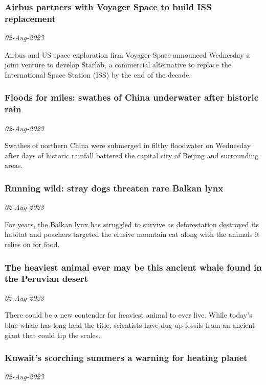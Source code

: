 \subsubsection{Airbus partners with Voyager Space to build ISS replacement \href{https://phys.org/news/2023-08-airbus-partners-voyager-space-iss.html}{}}
\textit{02-Aug-2023}

Airbus and US space exploration firm Voyager Space announced Wednesday a joint venture to develop Starlab, a commercial alternative to replace the International Space Station (ISS) by the end of the decade.
\subsubsection{Floods for miles: swathes of China underwater after historic rain \href{https://phys.org/news/2023-08-miles-swathes-china-underwater-historic.html}{}}
\textit{02-Aug-2023}

Swathes of northern China were submerged in filthy floodwater on Wednesday after days of historic rainfall battered the capital city of Beijing and surrounding areas.
\subsubsection{Running wild: stray dogs threaten rare Balkan lynx \href{https://phys.org/news/2023-08-wild-stray-dogs-threaten-rare.html}{}}
\textit{02-Aug-2023}

For years, the Balkan lynx has struggled to survive as deforestation destroyed its habitat and poachers targeted the elusive mountain cat along with the animals it relies on for food.
\subsubsection{The heaviest animal ever may be this ancient whale found in the Peruvian desert \href{https://phys.org/news/2023-08-heaviest-animal-ancient-whale-peruvian.html}{}}
\textit{02-Aug-2023}

There could be a new contender for heaviest animal to ever live. While today's blue whale has long held the title, scientists have dug up fossils from an ancient giant that could tip the scales.
\subsubsection{Kuwait's scorching summers a warning for heating planet \href{https://phys.org/news/2023-08-kuwait-summers-planet.html}{}}
\textit{02-Aug-2023}

